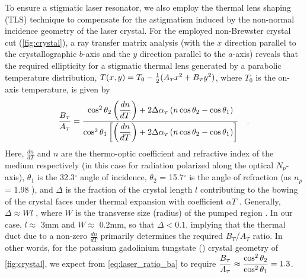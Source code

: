 To ensure a stigmatic laser resonator, we also employ the thermal lens shaping (TLS) technique \cite{Rimington_thermal_lens_2004} to compensate for the astigmatism induced by the non-normal incidence geometry of the laser crystal. 
For the employed non-Brewster crystal cut (\ref{fig:crystal}), a ray
transfer matrix analysis (with the $x$ direction parallel to the crystallographic $b$-axis and the $y$
direction parallel to the $a$-axis) reveals that the required ellipticity for a stigmatic thermal lens
generated by a parabolic temperature distribution, $T(x, y) = T_0 - \frac{1}{2} ( A_{{\scriptscriptstyle T}} x^2 + B_{{\scriptscriptstyle T}} y^2 )$, where $T_0$
is the on-axis temperature, is given by
\begin{equation} \label{eq:laser_ratio_ba}
  \frac{B_{{\scriptscriptstyle T}}}{A_{{\scriptscriptstyle T}}} = 
  \frac{ \cos^2 \theta_2 \left( \dfrac{dn}{dT} \right) + 2 \Delta \alpha_{{\scriptscriptstyle T}} \left( n \cos\theta_2 - \cos\theta_1 \right) }
       { \cos^2 \theta_1 \left[ \left( \dfrac{dn}{dT} \right) + 2 \Delta \alpha_{{\scriptscriptstyle T}} \left( n \cos\theta_2 - \cos\theta_1 \right) \right] }
  \quad\text{.}
\end{equation}
Here, $\frac{dn}{dT}$ and $n$ are the thermo-optic coefficient and refractive index of the medium respectively (in this case for radiation polarized along the optical $N_p$-axis), $\theta_1$ is the 32.3$^\circ$ angle of incidence, $\theta_2$ = 15.7$^\circ$ is the angle of refraction (as $n_p$ = 1.98 \cite{Biswal_thermo_optical_05,pujol_crystalline_1999}), and $\Delta$ is the fraction of the crystal length $l$ contributing to the bowing of the crystal faces under thermal
expansion with coefficient $\alpha T$ \cite{Rimington_thermal_lens_2004}.
Generally, $\Delta \approx W l$ , where $W$ is the transverse size (radius) of the pumped region \cite{Koechner_thermal_1970}.
In our case, $l \approx$ 3mm and $W \approx$ 0.2mm, so that $\Delta < 0.1$, implying that the thermal duct due to a non-zero $\frac{dn}{dT}$ primarily determines the required $B_T$/$A_T$ ratio.
In other words, for the potassium gadolinium tungstate () crystal geometry of \ref{fig:crystal}, we expect from \ref{eq:laser_ratio_ba} to require $\dfrac{B_{{\scriptscriptstyle T}}}{A_{{\scriptscriptstyle T}}} \approx \dfrac{ \cos^2 \theta_2 }{ \cos^2 \theta_1 } = 1.3$.

